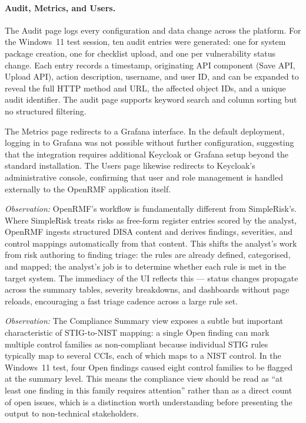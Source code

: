 \paragraph{Audit, Metrics, and Users.}
The Audit page logs every configuration and data change across the platform.
For the Windows~11 test session, ten audit entries were generated: one for
system package creation, one for checklist upload, and one per vulnerability
status change. Each entry records a timestamp, originating API component
(Save API, Upload API), action description, username, and user ID, and can
be expanded to reveal the full HTTP method and URL, the affected object
IDs, and a unique audit identifier. The audit page supports keyword search
and column sorting but no structured filtering.

The Metrics page redirects to a Grafana interface. In the default
deployment, logging in to Grafana was not possible without further
configuration, suggesting that the integration requires additional Keycloak
or Grafana setup beyond the standard installation. The Users page likewise
redirects to Keycloak's administrative console, confirming that user and
role management is handled externally to the OpenRMF application itself.

\textit{Observation:} OpenRMF's workflow is fundamentally different from
SimpleRisk's. Where SimpleRisk treats risks as free-form register entries
scored by the analyst, OpenRMF ingests structured DISA content and derives
findings, severities, and control mappings automatically from that content.
This shifts the analyst's work from risk authoring to finding triage: the
rules are already defined, categorised, and mapped; the analyst's job is to
determine whether each rule is met in the target system. The immediacy of
the UI reflects this — status changes propagate across the summary tables,
severity breakdowns, and dashboards without page reloads, encouraging a
fast triage cadence across a large rule set.

\textit{Observation:} The Compliance Summary view exposes a subtle but
important characteristic of STIG-to-NIST mapping: a single Open finding can
mark multiple control families as non-compliant because individual STIG
rules typically map to several CCIs, each of which maps to a NIST control.
In the Windows~11 test, four Open findings caused eight control families
to be flagged at the summary level. This means the compliance view should
be read as ``at least one finding in this family requires attention''
rather than as a direct count of open issues, which is a distinction worth
understanding before presenting the output to non-technical stakeholders.

